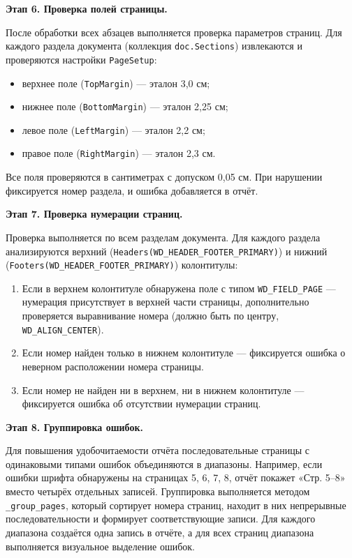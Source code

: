 \textbf{Этап 6. Проверка полей страницы.}

После обработки всех абзацев выполняется проверка параметров страниц. Для каждого раздела документа (коллекция \texttt{doc.Sections}) извлекаются и проверяются настройки \texttt{PageSetup}:

\begin{itemize}
	\item верхнее поле (\texttt{TopMargin}) — эталон 3,0 см;
	\item нижнее поле (\texttt{BottomMargin}) — эталон 2,25 см;
	\item левое поле (\texttt{LeftMargin}) — эталон 2,2 см;
	\item правое поле (\texttt{RightMargin}) — эталон 2,3 см.
\end{itemize}

Все поля проверяются в сантиметрах с допуском 0,05 см. При нарушении фиксируется номер раздела, и ошибка добавляется в отчёт.

\textbf{Этап 7. Проверка нумерации страниц.}

Проверка выполняется по всем разделам документа. Для каждого раздела анализируются верхний (\texttt{Headers(WD\_HEADER\_FOOTER\_PRIMARY)}) и нижний (\texttt{Footers(WD\_HEADER\_FOOTER\_PRIMARY)}) колонтитулы:

\begin{enumerate}
	\item Если в верхнем колонтитуле обнаружена поле с типом \texttt{WD\_FIELD\_PAGE} — нумерация присутствует в верхней части страницы, дополнительно проверяется выравнивание номера (должно быть по центру, \texttt{WD\_ALIGN\_CENTER}).
	\item Если номер найден только в нижнем колонтитуле — фиксируется ошибка о неверном расположении номера страницы.
	\item Если номер не найден ни в верхнем, ни в нижнем колонтитуле — фиксируется ошибка об отсутствии нумерации страниц.
\end{enumerate}

\textbf{Этап 8. Группировка ошибок.}

Для повышения удобочитаемости отчёта последовательные страницы с одинаковыми типами ошибок объединяются в диапазоны. Например, если ошибки шрифта обнаружены на страницах 5, 6, 7, 8, отчёт покажет «Стр. 5–8» вместо четырёх отдельных записей. Группировка выполняется методом \texttt{\_group\_pages}, который сортирует номера страниц, находит в них непрерывные последовательности и формирует соответствующие записи. Для каждого диапазона создаётся одна запись в отчёте, а для всех страниц диапазона выполняется визуальное выделение ошибок.

